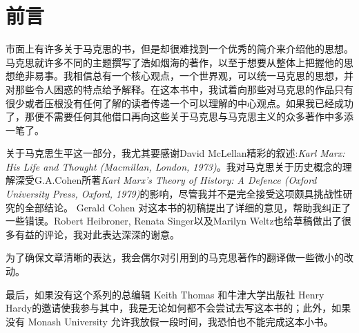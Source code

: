 \chapter{前言}
市面上有许多关于马克思的书，但是却很难找到一个优秀的简介来介绍他的思想。马克思就许多不同的主题撰写了浩如烟海的著作，以至于想要从整体上把握他的思想绝非易事。我相信总有一个核心观点，一个世界观，可以统一马克思的思想，并对那些令人困惑的特点给予解释。在这本书中，我试着向那些对马克思的作品只有很少或者压根没有任何了解的读者传递一个可以理解的中心观点。如果我已经成功了，那便不需要任何其他借口再向这些关于马克思与马克思主义的众多著作中多添一笔了。

关于马克思生平这一部分，我尤其要感谢David McLellan精彩的叙述:\textit{Karl Marx: His Life and Thought (Macmillan, London, 1973)}。我对马克思关于历史概念的理解深受G.A.Cohen所著\textit{Karl Marx’s Theory of History: A Defence (Oxford University Press, Oxford, 1979)}的影响，尽管我并不是完全接受这项颇具挑战性研究的全部结论。 Gerald Cohen 对这本书的初稿提出了详细的意见，帮助我纠正了一些错误。Robert Heibroner, Renata Singer以及Marilyn Weltz也给草稿做出了很多有益的评论，我对此表达深深的谢意。

为了确保文章清晰的表达，我会偶尔对引用到的马克思著作的翻译做一些微小的改动。

最后，如果没有这个系列的总编辑 Keith Thomas 和牛津大学出版社 Henry Hardy的邀请使我参与其中，我是无论如何都不会尝试去写这本书的；此外，如果没有 Monash University 允许我放假一段时间，我恐怕也不能完成这本小书。




